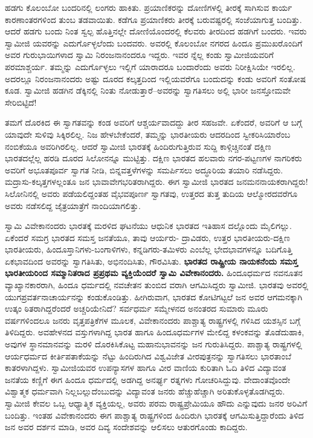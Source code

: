 ಹಡಗು ಕೊಲಂಬೋ ಬಂದರಿನಲ್ಲಿ ಲಂಗರು ಹಾಕಿತು. ಪ್ರಯಾಣಿಕರನ್ನು ದೋಣಿಗಳಲ್ಲಿ ತೀರಕ್ಕೆ ಸಾಗಿಸುವ ಕಾರ್ಯ ಕಾರಣಾಂತರಗಳಿಂದ ತುಂಬ ತಡವಾಯಿತು. ಕಡೆಗೂ ಪ್ರಯಾಣಿಕರು ತೀರಕ್ಕೆ ಬರುವಷ್ಟರಲ್ಲಿ ಸಂಜೆಯಾಗುತ್ತ ಬಂದಿತ್ತು. ಆದರೆ ಹಡಗು ಬಂದು ನಿಂತ ಸ್ವಲ್ಪ ಹೊತ್ತಿನಲ್ಲೇ ದೋಣಿಯೊಂದರಲ್ಲಿ ಕೆಲವರು ತೀರದಿಂದ ಹಡಗಿಗೆ ಬಂದರು. ಇವರು ಸ್ವಾಮೀಜಿ ಯವರನ್ನು ಎದುರ್ಗೊಳ್ಳಲೆಂದು ಬಂದವರು. ಅವರಲ್ಲಿ ಕೊಲಂಬೋ ನಗರದ ಹಿಂದೂ ಪ್ರಮುಖರೊಂದಿಗೆ ಅವರ ಗುರುಭಾಯಿಗಳಾದ ಸ್ವಾಮಿ ನಿರಂಜನಾನಂದರೂ ಇದ್ದರು. ಇವರ ನ್ನೆಲ್ಲ ಕಂಡು ಸ್ವಾಮೀಜಿಯವರಿಗೆ ಪರಮಾಶ್ಚರ್ಯ. ತಮ್ಮನ್ನು ಎದುರ್ಗೊಳ್ಳಲು ಇಲ್ಲಿಗೆ ಯಾರಾದರೂ ಬಂದಾರೆಂದು ಅವರು ನಿರೀಕ್ಷಿಸಿಯೇ ಇರಲಿಲ್ಲ. ಅದರಲ್ಲೂ ನಿರಂಜನಾನಂದರು ಅಷ್ಟು ದೂರದ ಕಲ್ಕತ್ತದಿಂದ ಇಲ್ಲಿಯವರೆಗೂ ಬಂದುದನ್ನು ಕಂಡು ಅವರಿಗೆ ಸಂತೋಷ ಕೂಡ. ಸ್ವಾಮೀಜಿ ಹಡಗಿನ ಡೆಕ್ಕಿನಲ್ಲಿ ನಿಂತು ನೋಡುತ್ತಾರೆ–ಅವರನ್ನು ಸ್ವಾಗತಿಸಲು ಅಲ್ಲಿ ಭಾರೀ ಜನಸ್ತೋಮವೇ ಸೇರಿಬಿಟ್ಟಿದೆ!

ತಮಗೆ ದೊರಕಿದ ಈ ಸ್ವಾಗತವನ್ನು ಕಂಡ ಅವರಿಗೆ ಆಶ್ಚರ್ಯವಾದದ್ದು ತೀರ ಸಹಜವೇ. ಏಕೆಂದರೆ, ಅವರಿಗೆ ಆ ಬಗ್ಗೆ ಯಾವುದೇ ಸುಳಿವು ಸಿಕ್ಕಿರಲಿಲ್ಲ. ನಿಜ ಹೇಳಬೇಕೆಂದರೆ, ತಮ್ಮನ್ನು ಭಾರತೀಯರು ಆದರದಿಂದ ಸ್ವೀಕರಿಸಿಯಾರೆಂಬ ನಂಬಿಕೆಯೂ ಅವರಿಗಿರಲಿಲ್ಲ. ಆದರೆ ಸ್ವಾಮೀಜಿ ಭಾರತಕ್ಕೆ ಹಿಂದಿರುಗುತ್ತಿರುವ ಸುದ್ದಿ ಕಾಳ್ಗಿಚ್ಚಿನಂತೆ ದಕ್ಷಿಣ ಭಾರತದಲ್ಲೆಲ್ಲ ಹರಡಿ ದೂರದ ಸಿಲೋನನ್ನೂ ಮುಟ್ಟಿತ್ತು. ದಕ್ಷಿಣ ಭಾರತದ ಹಲವಾರು ನಗರ-ಪಟ್ಟಣಗಳ ನಾಗರಿಕರು ಅವರಿಗೆ ಅಭೂತಪೂರ್ವ ಸ್ವಾಗತ ನೀಡಿ, ಬಿನ್ನವತ್ತಳೆಗಳನ್ನು ಸಮರ್ಪಿಸಲು ಅದ್ಧೂರಿಯ ತಯಾರಿ ನಡೆಸಿದ್ದರು. ಮದ್ರಾಸು-ಕಲ್ಕತ್ತಗಳಲ್ಲಂತೂ ಜನ ಭಾವಾವೇಗಭರಿತರಾಗಿದ್ದರು. ಈಗ ಸ್ವಾಮೀಜಿ ಭಾರತದ ಜನಮನನಾಯಕರಾಗಿದ್ದರು! ಸಿಲೋನಿನಲ್ಲಿ ಅವರು ಪಡೆಯಲಿದ್ದಂತಹ ವೈಭವಪೂರ್ಣ ಸ್ವಾಗತವು, ಉತ್ತರದ ತುತ್ತ ತುದಿಯ ಆಲ್ಮೋರದವರೆಗೂ ಅವರು ನಡೆಸಲಿದ್ದ ಜೈತ್ರಯಾತ್ರೆಗೆ ನಾಂದಿಯಾಗಲಿತ್ತು.

ಸ್ವಾಮಿ ವಿವೇಕಾನಂದರು ಭಾರತಕ್ಕೆ ಮರಳಿದ ಘಟನೆಯು ಆಧುನಿಕ ಭಾರತದ ಇತಿಹಾಸ ದಲ್ಲೊಂದು ಮೈಲಿಗಲ್ಲು. ಏಕೆಂದರೆ ಸಮಗ್ರ ಭಾರತದ ಸಮಸ್ತ ಜನತೆಯೂ, ತಾವು ಆರ್ಯರು- ದ್ರಾವಿಡರು, ಉತ್ತರ ಭಾರತೀಯರು-ದಕ್ಷಿಣ ಭಾರತೀಯರು, ಹಿಂದೂಸ್ತಾನಿಗಳು-ಬಂಗಾಳಿಗಳು, ಕನ್ನಡಿಗರು-ತಮಿಳರು ಎಂಬೆಲ್ಲ ಭೇದಭಾವಗಳನ್ನೂ ಬದಿಗೊತ್ತಿ ಏಕಭಾವದಿಂದ ಅವರನ್ನು ಸ್ವಾಗತಿಸಿತು, ಅಭಿನಂದಿಸಿತು, ಗೌರವಿಸಿತು. \textbf{ಭಾರತದ ರಾಷ್ಟ್ರೀಯ ನಾಯಕನೆಂದು ಸಮಸ್ತ ಭಾರತೀಯರಿಂದ ಸಮ್ಮಾನಿತರಾದ ಪ್ರಪ್ರಥಮ ವ್ಯಕ್ತಿಯೆಂದರೆ ಸ್ವಾಮಿ ವಿವೇಕಾನಂದರು.} ಹಿಂದೂಧರ್ಮದ ನವನೂತನ ವ್ಯಾಖ್ಯಾನಕಾರರಾಗಿ, ಹಿಂದೂ ಧರ್ಮದಲ್ಲಿ ನವಚೇತನ ತುಂಬಿದ ವರಾಗಿ ಆಗಮಿಸಿದ್ದರು ಸ್ವಾಮೀಜಿ. ಭಾರತವು ಅವರಲ್ಲಿ ಯುಗಪ್ರವರ್ತನಾಚಾರ್ಯನನ್ನು ಕಂಡುಕೊಂಡಿತ್ತು. ಹೀಗಿರುವಾಗ, ಭಾರತದ ಕೋಟಿಗಟ್ಟಲೆ ಜನ ಅವರ ಆಗಮನಕ್ಕಾಗಿ ಉತ್ಕಂ ಠಿತರಾಗಿದ್ದರೆಂದರೆ ಅಚ್ಚರಿಯೇನಿದೆ? ಸರ್ವಧರ್ಮ ಸಮ್ಮೇಳನದ ಅನಂತರದ ಸುಮಾರು ಮೂರು ವರ್ಷಗಳಿಂದಲೂ ಜನರು ವೃತ್ತಪತ್ರಿಕೆಗಳ ಮೂಲಕ, ವಿವೇಕಾನಂದರು ಪಾಶ್ಚಾತ್ಯ ರಾಷ್ಟ್ರಗಳಲ್ಲಿ ಗಳಿಸಿದ ಯಶಸ್ಸಿನ ಬಗ್ಗೆ ತಿಳಿದಿದ್ದರು. ಅವಹೇಳನದ ವಸ್ತುಗಳಾಗಿದ್ದ ಭಾರತ ಹಾಗೂ ಹಿಂದೂಧರ್ಮಗಳ ಮೇಲಿದ್ದ ಕಳಂಕವನ್ನು ತೊಡೆದುಹಾಕಿ, ಅವುಗಳ ಸ್ಥಾನಮಾನವನ್ನು ಮರಳಿ ದೊರಕಿಸಿಕೊಟ್ಟ ಮಹಾನುಭಾವನನ್ನು ಜನ ಗುರುತಿಸಿದ್ದರು. ಪಾಶ್ಚಾತ್ಯ ರಾಷ್ಟ್ರಗಳಲ್ಲಿ ಆರ್ಯಧರ್ಮದ ಕೀರ್ತಿಪತಾಕೆಯನ್ನು ನೆಟ್ಟು ಹಿಂದಿರುಗಿದ ವಿಶ್ವವಿಜೇತ ವೀರಪುತ್ರನನ್ನು ಸ್ವಾಗತಿಸಲು ಭಾರತಾಂಬೆ ಕಾತರಳಾಗಿದ್ದಳು. ಸ್ವಾಮೀಜಿಯವರ ಉಪನ್ಯಾಸಗಳ ಹಾಗೂ ವೀರ ವಾಣಿಯ ಕುರಿತಾಗಿ ಓದಿ ತಿಳಿದ ವಿದ್ಯಾವಂತ ಜನತೆಯ ಕಣ್ಣಿಗೆ ಈಗ ಹಿಂದೂ ಧರ್ಮದಲ್ಲಿ ಅಡಗಿದ್ದ ಅನರ್ಘ್ಯ ರತ್ನಗಳು ಗೋಚರಿಸಿದ್ದುವು. ವೇದಾಂತವೊಂದೇ ವಿಶ್ವಾತ್ಮಕ ಧರ್ಮವಾಗಿ ನಿಲ್ಲಬಲ್ಲುದೆಂಬುದನ್ನು ವಿದ್ಯಾವಂತ ಜನರು ಹೆಚ್ಚುಹೆಚ್ಚಾಗಿ ಅರಿತುಕೊಳ್ಳತೊಡಗಿದ್ದರು. ಸ್ವಾಮೀಜಿ ಕೇವಲ ಒಬ್ಬ ಆಧ್ಯಾತ್ಮಿಕ ವ್ಯಕ್ತಿಯಲ್ಲ, ಅವರು ಪರಮ ರಾಷ್ಟ್ರಪ್ರೇಮಿಯೂ ಹೌದು ಎನ್ನುವುದು ಜನರ ಅರಿವಿಗೆ ಬಂದಿತ್ತು. ಇಂತಹ ವಿವೇಕಾನಂದರು ಈಗ ಪಾಶ್ಚಾತ್ಯ ರಾಷ್ಟ್ರಗಳಿಂದ ಹಿಂದಿರುಗಿ ಭಾರತಕ್ಕೆ ಆಗಮಿಸುತ್ತಿದ್ದಾರೆಂದು ತಿಳಿದ ಜನ ಅವರ ದರ್ಶನ ಮಾಡಿ, ಅವರ ದಿವ್ಯ ಸಂದೇಶವನ್ನು ಆಲಿಸಲು ಆತುರಗೊಂಡು ಕಾದಿದ್ದರು.

